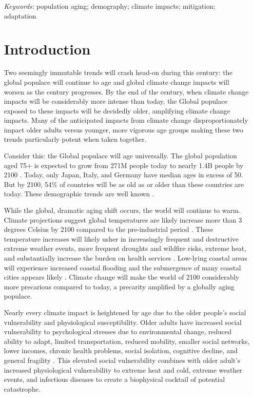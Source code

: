 \documentclass[12pt]{article}
\begin{document}
\noindent%
{\it Keywords:} population aging; demography; climate impacts;
mitigation; adaptation

\vfill

\newpage
{} %

\hypertarget{introduction}{%
\section{Introduction}\label{introduction}}

Two seemingly immutable trends will crash head-on during this century:
the global populace will continue to age and global climate change
impacts will worsen as the century progresses. By the end of the
century, when climate change impacts will be considerably more intense
than today, the Global populace exposed to these impacts will be
decidedly older, amplifying climate change impacts. Many of the
anticipated impacts from climate change disproportionately impact older
adults versus younger, more vigorous age groups making these two trends
particularly potent when taken together.

Consider this: the Global populace will age universally. The global
population aged 75+ is expected to grow from 271M people today to nearly
1.4B people by 2100 \citep{division_wpp2017}. Today, only Japan, Italy,
and Germany have median ages in excess of 50. But by 2100, 54\% of
countries will be as old as or older than these countries are today.
These demographic trends are well known
\citep{lutz2008coming, beard2016world}.

While the global, dramatic aging shift occurs, the world will continue
to warm. Climate projections suggest global temperatures are likely
increase more than 3 degrees Celsius by 2100 compared to the
pre-industrial period \citep{arias2021climate}. These temperature
increases will likely usher in increasingly frequent and destructive
extreme weather events, more frequent droughts and wildfire risks,
extreme heat, and substantially increase the burden on health services
\citep{portner2022climate}. Low-lying coastal areas will experience
increased coastal flooding and the submergence of many coastal cities
appears likely \citep{kulp2019new}. Climate change will make the world
of 2100 considerably more precarious compared to today, a precarity
amplified by a globally aging populace.

Nearly every climate impact is heightened by age due to the older
people's social vulnerability and physiological susceptibility. Older
adults have increased social vulnerability to psychological stresses due
to environmental change, reduced ability to adapt, limited
transportation, reduced mobility, smaller social networks, lower
incomes, chronic health problems, social isolation, cognitive decline,
and general fragility \citep{kovats2008heat}. This elevated social
vulnerability combines with older adult's increased physiological
vulnerability to extreme heat and cold, extreme weather events, and
infectious diseases to create a biophysical cocktail of potential
catastrophe.
\end{document}
